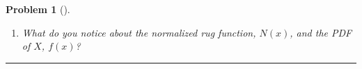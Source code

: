 \documentclass[letterpaper,oneside]{book}%
\theoremstyle{plain}
\theoremstyle{box}
\theoremstyle{problem}
\newtheorem{problemnum}{Problem}[chapter]
\newenvironment{problem}[1][]{\begin{problemnum}[#1]}{\end{problemnum}\nopagebreak\hrule\bigskip}
\begin{document}
\begin{problem}
\begin{enumerate}
\begin{enumerate}
  Recall, $\lim_{\Delta x \rightarrow 0}\frac{F(a + \Delta x) - F(a)}{\Delta x} = F'(x)$. Note that $\lim_{\Delta x \rightarrow 0}\frac{1}{25} (2a + \Delta x) = \frac{1}{25}(2a) = \frac{2a}{25}$.
  \item Calculate $F'(x)$. Did you get $F'(x) = \frac{1}{25}2a = \frac{2a}{25} = \frac{2}{25} a$?
  \item Notice the left side of the equation $\frac{F(a + \Delta x) - F(a)}{\Delta x}$ has units probability per length. Probability per length is a density, a probability density. So the function $F'(x)$ is usually called a probability density function, $f(x)$. 
  \end{enumerate}
  \item What do you notice about the normalized rug function, $N(x)$, and the PDF of $X$, $f(x)$?
 \end{enumerate}

\end{problem}
\end{document}
